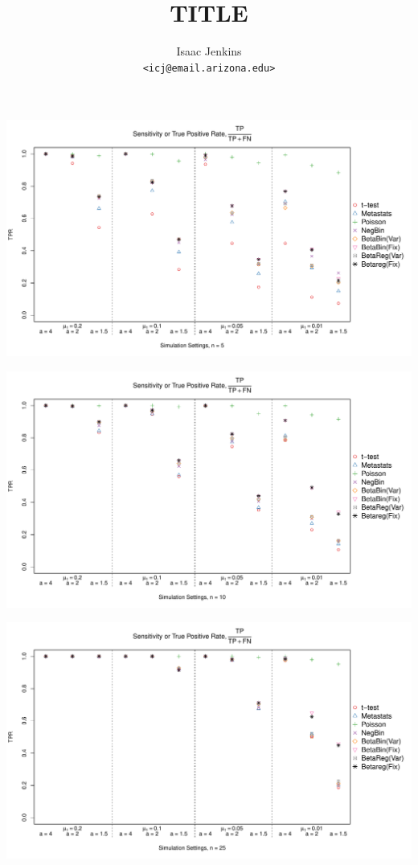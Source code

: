 \documentclass[12pt]{article}\usepackage{graphicx, color}
\title{TITLE}
\author{Isaac Jenkins \\ {\tt <icj@email.arizona.edu>}}
\makeatletter
\def\maxwidth{ %
  \ifdim\Gin@nat@width>\linewidth
    \linewidth
  \else
    \Gin@nat@width
  \fi
}
\newenvironment{knitrout}{}{} %
\makeatother
\begin{document}

\begin{knitrout}
\color{fgcolor}

{\centering \includegraphics[width=\maxwidth]{figure/panelPlots1} 

}




{\centering \includegraphics[width=\maxwidth]{figure/panelPlots2} 

}




{\centering \includegraphics[width=\maxwidth]{figure/panelPlots3} 

}
\end{knitrout}
\end{document}
